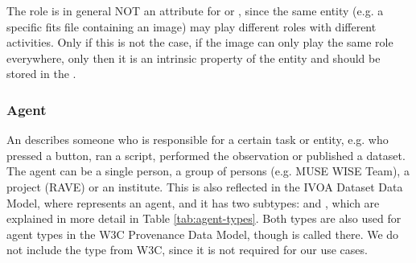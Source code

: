 The role is in general NOT an attribute for  or , 
since the same entity (e.g. a specific fits file containing an image) may play 
different roles with different activities. Only if this is not the case, if the 
image can only play the same role everywhere, only then it is an intrinsic 
property of the entity and should be stored in the .



%







\subsubsection{Agent}\label{sec:w3c-agent}

An  describes someone who is responsible for a certain task or
entity, e.g. who pressed a button, 
ran a script, performed the observation or published a dataset.
The agent can be a single person, a group of persons (e.g. MUSE WISE Team), a 
project (RAVE) or an institute. 
This is also reflected in the IVOA Dataset Data Model, where  
represents an agent, and it has two subtypes:  and ,
which are explained in more detail in Table \ref{tab:agent-types}.
Both types are also used for agent types in the W3C Provenance Data Model, though 
 is called  there. 
We do not include the type  from W3C, since it is not required for 
our use cases.

